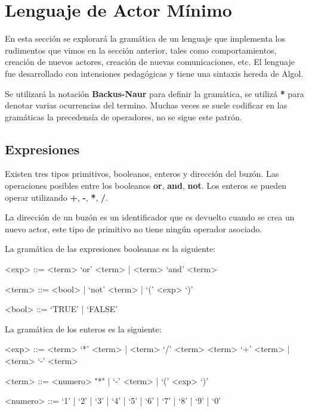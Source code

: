 \chapter{Lenguaje de Actor Mínimo}

En esta sección se explorará la gramática de un lenguaje que implementa los rudimentos que vimos en la sección anterior, tales como comportamientos, creación de nuevos actores, creación de nuevas comunicaciones, etc. El lenguaje \SAL fue desarrollado con intensiones pedagógicas y tiene una sintaxis hereda de Algol. 

Se utilizará la notación \textbf{Backus-Naur} para definir la gramática, se utilizá \textbf{*} para denotar varias ocurrencias del termino. Muchas veces se suele codificar en las gramáticas la precedensía de operadores, no se sigue este patrón.

\section{Expresiones}
Existen tres tipos primitivos, booleanos, enteros y dirección del buzón. Las operaciones posibles entre los booleanos \textbf{or}, \textbf{and}, \textbf{not}. Los enteros se pueden operar utilizando \textbf{+}, \textbf{-}, \textbf{*}, \textbf{/}.

La dirección de un buzón es un identificador que es devuelto cuando se crea un nuevo actor,  este tipo de primitivo no tiene ningún operador asociado.

La gramática de las expresiones booleanas es la siguiente:

\begin{grammar}

<exp> ::= <term> `or' <term> | <term> `and' <term> 
  
<term> ::= <bool> | `not' <term> | `(' <exp> `)' 

<bool> ::= `TRUE' | `FALSE'

\end{grammar}

La gramática de los enteros es la siguiente:

\begin{grammar}

<exp> ::= <term> `*' <term> | <term> `/' <term>  
  \alt <term> `+' <term>  | <term> `-' <term>

<term> ::= <numero> "*" | `-' <term> | `(' <exp> `)'

<numero> ::= `1' | `2' | `3' | `4' | `5' | `6' | `7' | `8' | `9' | `0'

\end{grammar}


